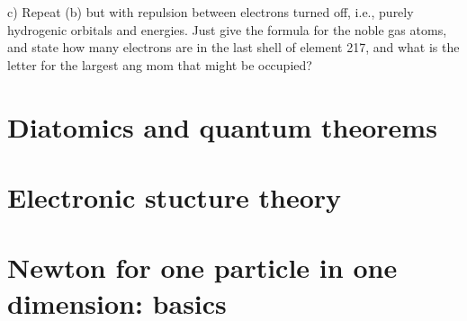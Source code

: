 c) Repeat (b) but with repulsion between electrons turned off, i.e.,
purely hydrogenic orbitals and energies.  Just give the formula for the
noble gas atoms, and state how many electrons are in the last shell
of element 217, and what is the letter for the largest ang mom that
might be occupied?


\newpage

\part{Diatomics and quantum theorems}
\newpage
\part{Electronic stucture theory}
\label{page:end}


\part{Newton for one particle in one dimension: basics}
\newpage
{}

